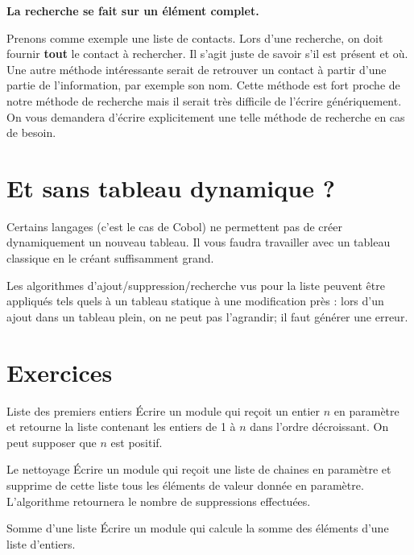 \bigskip

\textbf{La recherche se fait sur un élément complet.}

Prenons comme exemple une liste de contacts.
Lors d'une recherche, on doit fournir
\textbf{tout} le contact à
rechercher. Il s'agit juste de savoir
s'il est présent et où. Une autre méthode intéressante
serait de retrouver un contact à partir d'une partie
de l'information, par exemple son nom. Cette méthode
est fort proche de notre méthode de recherche mais il serait très
difficile de l'écrire génériquement. On vous demandera
d'écrire explicitement une telle méthode de recherche
en cas de besoin.


\section{Et sans tableau dynamique ?}

Certains langages (c’est le cas de Cobol) ne permettent pas de créer
dynamiquement un nouveau tableau. Il vous faudra travailler avec un
tableau classique en le créant suffisamment grand.


Les algorithmes d’ajout/suppression/recherche vus pour la liste peuvent
être appliqués tels quels à un tableau statique à une modification près
: lors d’un ajout dans un tableau plein, on ne peut pas l’agrandir; il
faut générer une erreur.


\section{Exercices}

\begin{Exercice}{Liste des premiers entiers}
	Écrire un module qui reçoit un entier $n$ en paramètre et retourne la
	liste contenant les entiers de 1 à $n$ dans l'ordre
	décroissant. On peut supposer que $n$ est positif.
\end{Exercice}
	
\begin{Exercice}{Le nettoyage}
	Écrire un module qui reçoit une liste de chaines en paramètre et
	supprime de cette liste tous les éléments de valeur donnée en
	paramètre. L'algorithme retournera le nombre de
	suppressions effectuées.
\end{Exercice}
	
\begin{Exercice}{Somme d'une liste}
	Écrire un module qui calcule la somme des éléments d’une liste
	d’entiers.
\end{Exercice}

